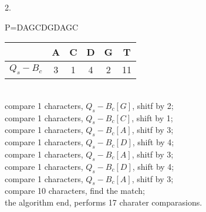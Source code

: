 \documentclass[UTF8]{ctexart}
\begin{document}
    \begin{table}[htbp]	
    \end{table}
    2.
    \begin{center}
    	P=DAGCDGDAGC\\
    	\begin{tabular}{|c|ccccc|}
    		\hline
    		&A&C&D&G&T\\
    		\hline
    		$Q_s-B_c$&3&1&4&2&11\\
    		\hline
    	\end{tabular}
    ~\\compare 1 characters, $Q_s-B_c[G]$, shitf by 2; \\
    compare 1 characters, $Q_s-B_c[C]$, shift by 1;\\
    compare 1 characters, $Q_s-B_c[A]$, shitf by 3; \\
    compare 1 characters, $Q_s-B_c[D]$, shift by 4;\\
    compare 1 characters, $Q_s-B_c[A]$, shitf by 3; \\
    compare 1 characters, $Q_s-B_c[D]$, shift by 4;\\
    compare 1 characters, $Q_s-B_c[A]$, shitf by 3; \\
    compare 10 characters, find the match;\\
    the algorithm end, performs 17 charater comparasions.
    \end{center}
\end{document}
